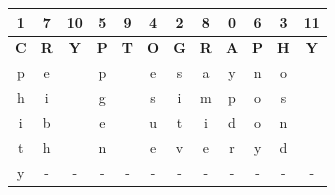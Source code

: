 \documentclass{ashoka-crypto}
\begin{document}
\begin{center}
\begin{tabular}{|c|c|c|c|c|c|c|c|c|c|c|c|}
\hline
1          & 7          & 10         & 5          & 9          & 4          & 2          & 8          & 0          & 6          & 3          & 11         \\ \hline
\textbf{C} & \textbf{R} & \textbf{Y} & \textbf{P} & \textbf{T} & \textbf{O} & \textbf{G} & \textbf{R} & \textbf{A} & \textbf{P} & \textbf{H} & \textbf{Y} \\ \hline
p          & e          &            & p          &            & e          & s          & a          & y          & n          & o          &            \\ \hline
h          & i          &            & g          &            & s          & i          & m          & p          & o          & s          &            \\ \hline
i          & b          &            & e          &            & u          & t          & i          & d          & o          & n          &            \\ \hline
t          & h          &            & n          &            & e          & v          & e          & r          & y          & d          &            \\ \hline
y          &     -       &    -        &      -     &     -       &      -      &     -       &     -       &      -      &     -       &       -     &  -            \\ \hline
\end{tabular}
\end{center}
\end{document}

